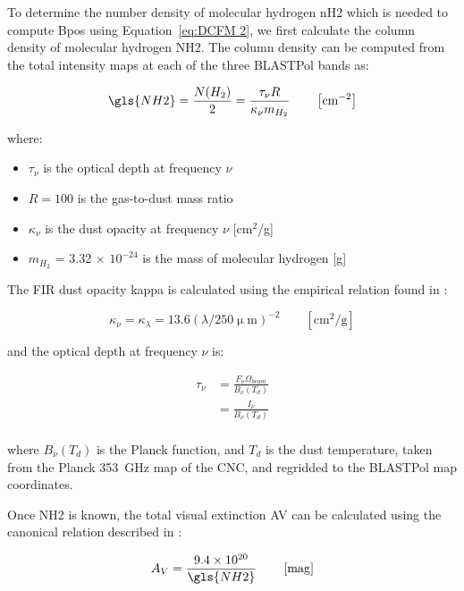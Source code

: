 To determine the number density of molecular hydrogen \gls{nH2} which is needed to compute \gls{Bpos} using Equation~\ref{eq:DCFM 2}, we first calculate the column density of molecular hydrogen \gls{NH2}. The column density can be computed from the total intensity maps at each of the three BLASTPol bands as:

\begin{equation}\label{eq:NH2}
  \gls{NH2} = \frac{N(H_{2})}{2} = \frac{ \tau_{\nu} R}{\kappa_{\nu} m_{H_2}} \qquad \left[ \text{cm}^{-2} \right]
\end{equation}

where:
\begin{itemize}[label={},nosep]
  \item $\tau_{\nu}$ is the optical depth at frequency $\nu$
  \item $R = 100$ is the gas-to-dust mass ratio
  \item $\kappa_{\nu}$ is the dust opacity at frequency $\nu$ [cm$^{2}$/g]
  \item $m_{H_2}$ = 3.32 $\times$ $10^{-24}$ is the mass of molecular hydrogen [g]
\end{itemize}

The FIR dust opacity \gls{kappa} is calculated using the empirical relation found in \citet{mathis1990interstellar}:

\begin{equation}\label{eq:kappa}
  \kappa_{\nu} = \kappa_{\lambda} = 13.6 (\lambda / 250 \mathrm{\upmu m})^{-2} \qquad \left[ \mathrm{cm}^{2}/\mathrm{g} \right]
\end{equation}

and the optical depth at frequency $\nu$ is:

\begin{align}\label{eq:tau}
  \tau_{\nu} &= \frac{F_{\nu}\Omega_{beam}}{B_{\nu}(T_{d})} \\
          &= \frac{I_{\nu}}{B_{\nu}(T_{d})} \\
\end{align}

where $B_{\nu}(T_{d})$ is the Planck function, and $T_{d}$ is the dust temperature, taken from the Planck 353~GHz map of the CNC, and regridded to the BLASTPol map coordinates.

Once \gls{NH2} is known, the total visual extinction \gls{AV} can be calculated using the canonical relation described in \citet{bohlin224savage}:

\begin{equation}\label{eq:Av}
A_{V} = \frac{ 9.4 \times 10^{20}}{\gls{NH2}} \qquad \left[ \mathrm{mag} \right]
\end{equation}

